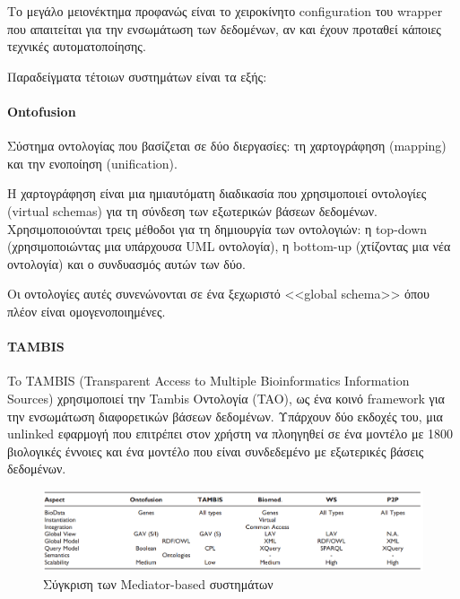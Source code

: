             Το μεγάλο μειονέκτημα προφανώς είναι το χειροκίνητο configuration του wrapper που απαιτείται για την ενσωμάτωση των δεδομένων, αν και έχουν προταθεί κάποιες τεχνικές αυτοματοποίησης.

            Παραδείγματα τέτοιων συστημάτων είναι τα εξής:

            \paragraph{Ontofusion}
                Σύστημα οντολογίας που βασίζεται σε δύο διεργασίες: τη χαρτογράφηση (mapping) και την ενοποίηση (unification).

                Η χαρτογράφηση είναι μια ημιαυτόματη διαδικασία που χρησιμοποιεί οντολογίες (virtual schemas) για τη σύνδεση των εξωτερικών βάσεων δεδομένων.
                Χρησιμοποιούνται τρεις μέθοδοι για τη δημιουργία των οντολογιών: η top-down (χρησιμοποιώντας μια υπάρχουσα UML οντολογία), η bottom-up (χτίζοντας μια νέα οντολογία) και ο συνδυασμός αυτών των δύο.

                Οι οντολογίες αυτές συνενώνονται σε ένα ξεχωριστό <<global schema>> όπου πλέον είναι ομογενοποιημένες.  \cite{Ontofusion}

            \paragraph{TAMBIS}
                To TAMBIS (Transparent Access to Multiple Bioinformatics Information Sources) χρησιμοποιεί την Tambis Οντολογία (TAO), ως ένα κοινό framework για την ενσωμάτωση διαφορετικών βάσεων δεδομένων.
                Υπάρχουν δύο εκδοχές του, μια unlinked εφαρμογή που επιτρέπει στον χρήστη να πλοηγηθεί σε ένα μοντέλο με 1800 βιολογικές έννοιες και ένα μοντέλο που είναι συνδεδεμένο με εξωτερικές βάσεις δεδομένων. \cite{TAMBIS}

            \begin{figure}[ht] \noindent\centering
                \includegraphics[scale=0.7]{img/Mediator based table}
                \caption{Σύγκριση των Mediator-based συστημάτων \cite{XMLbasedApproaches}}
            \end{figure}

